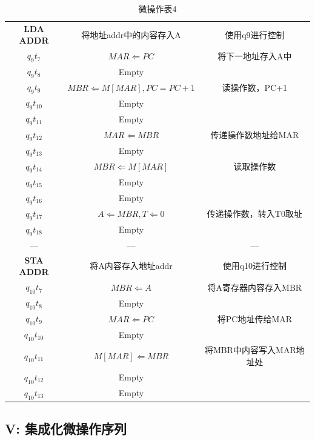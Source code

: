 \documentclass[UTF8]{ctexart}
\begin{document}
    \begin{table}[!htb]
        \centering
        \begin{tabular}{|c|c|c|}
          \hline
          \textbf{LDA ADDR} & 将地址addr中的内容存入A & 使用q9进行控制\\
          $q_9t_7$ & $MAR \Leftarrow PC$ & 将下一地址存入A中 \\
          $q_9t_8$ & Empty & \\
          $q_9t_9$ & $MBR \Leftarrow M[MAR], PC = PC + 1$ & 读操作数，PC+1\\
          $q_9t_{10}$ & Empty & \\
          $q_9t_{11}$ & Empty & \\
          $q_9t_{12}$ & $MAR \Leftarrow MBR$ & 传递操作数地址给MAR\\
          $q_9t_{13}$ & Empty & \\
          $q_9t_{14}$ & $MBR \Leftarrow M[MAR]$ & 读取操作数\\
          $q_9t_{15}$ & Empty & \\
          $q_9t_{16}$ & Empty & \\
          $q_9t_{17}$ & $A \Leftarrow MBR, T\Leftarrow 0$ & 传递操作数，转入T0取址\\
          $q_9t_{18}$ & Empty & \\
          ---&---&---\\
          \hline
          \textbf{STA ADDR} & 将A内容存入地址addr & 使用q10进行控制 \\
          $q_{10}t_7$ & $MBR \Leftarrow A$ & 将A寄存器内容存入MBR\\
          $q_{10}t_8$ & Empty & \\
          $q_{10}t_9$ & $MAR \Leftarrow PC$ & 将PC地址传给MAR\\
          $q_{10}t_{10}$ & Empty & \\
          $q_{10}t_{11}$ & $M[MAR] \Leftarrow MBR$ & 将MBR中内容写入MAR地址处\\
          $q_{10}t_{12}$ & Empty & \\
          $q_{10}t_{13}$ & Empty & \\
          \hline
        \end{tabular}
        \caption{微操作表4}\label{微操作表4}
      \end{table}
      \newpage

    \subsection{V: 集成化微操作序列}
\end{document}
